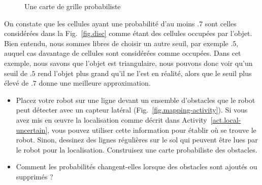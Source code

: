 \begin{figure}
\begin{center}
\caption{Une carte de grille probabiliste}\label{fig.prob-grid}
\end{center}
\end{figure}

On constate que les cellules ayant une probabilité d'au moins $.7$ sont celles considérées dans la Fig.~\ref{fig.disc} comme étant des cellules occupées par l'objet. Bien entendu, nous sommes libres de choisir un autre seuil, par exemple $.5$, auquel cas davantage de cellules sont considérées comme occupées. Dans cet exemple, nous savons que l'objet est triangulaire, nous pouvons donc voir qu'un seuil de $.5$ rend l'objet plus grand qu'il ne l'est en réalité, alors que le seuil plus élevé de $.7$ donne une meilleure approximation.

\begin{framed}
\begin{itemize}
\item Placez votre robot sur une ligne devant un ensemble d'obstacles que le robot peut détecter avec un capteur latéral (Fig.~\ref{fig.mapping-activity}). Si vous avez mis en œuvre la localisation comme décrit dans Activity~\ref{act.local-uncertain}, vous pouvez utiliser cette information pour établir où se trouve le robot. Sinon, dessinez des lignes régulières sur le sol qui peuvent être lues par le robot pour la localisation. Construisez une carte probabiliste des obstacles.
\item Comment les probabilités changent-elles lorsque des obstacles sont ajoutés ou supprimés ?
\end{itemize}
\end{framed}

